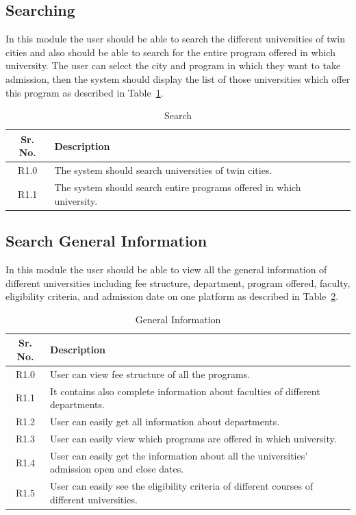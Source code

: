 \subsection{Searching}

In this module the user should be able to search the different universities of twin cities and also should be able to search for the entire program offered in which university. The user can select the city and program in which they want to take admission, then the system should display the list of those universities which offer this program as described in Table~\ref{tab:search_req}.

\begin{table}[H]
\centering
\caption{Search}
\label{tab:search_req}
\begin{tabularx}{\textwidth}{|c|X|}
\hline
\textbf{Sr. No.} & \textbf{Description} \\
\hline
R1.0 & The system should search universities of twin cities. \\
\hline
R1.1 & The system should search entire programs offered in which university. \\
\hline
\end{tabularx}
\end{table}

\subsection{Search General Information}

In this module the user should be able to view all the general information of different universities including fee structure, department, program offered, faculty, eligibility criteria, and admission date on one platform as described in Table~\ref{tab:general_req}.

\begin{table}[H]
\centering
\caption{General Information}
\label{tab:general_req}
\begin{tabularx}{\textwidth}{|c|X|}
\hline
\textbf{Sr. No.} & \textbf{Description} \\
\hline
R1.0 & User can view fee structure of all the programs. \\
\hline
R1.1 & It contains also complete information about faculties of different departments. \\
\hline
R1.2 & User can easily get all information about departments. \\
\hline
R1.3 & User can easily view which programs are offered in which university. \\
\hline
R1.4 & User can easily get the information about all the universities' admission open and close dates. \\
\hline
R1.5 & User can easily see the eligibility criteria of different courses of different universities. \\
\hline
\end{tabularx}
\end{table}

